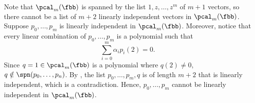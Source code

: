 \begin{sol}
    Note that $\pcal_m(\fbb)$ is spanned by the list $1, z, \ldots, z^m$ of $m + 1$ vectors, so there cannot be a list of $m + 2$ linearly independent vectors in $\pcal_m(\fbb)$. 
    Suppose $p_0, \ldots, p_m$ is linearly independent in $\pcal_m(\fbb)$.
    Moreover, notice that every linear combination of $p_0, \ldots, p_m$ is a polynomial such that
    \[
        \sum_{i = 0}^m \alpha_i p_i(2) = 0.
    \]
    Since $q = 1 \in \pcal_m(\fbb)$ is a polynomial where $q(2) \neq 0$, $q \notin \spn(p_0, \ldots, p_n)$.
    By , the list $p_0, \ldots, p_m, q$ is of length $m + 2$ that is linearly independent, which is a contradiction.
    Hence, $p_0, \ldots, p_m$ cannot be linearly independent in $\pcal_m(\fbb)$.
\end{sol}
